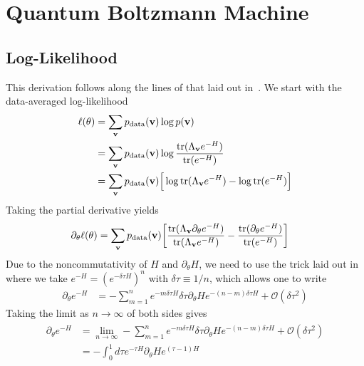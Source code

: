\section{Quantum Boltzmann Machine}
\subsection{Log-Likelihood}\label{app:qbm_log_likelihood_derivation}
This derivation follows along the lines of that laid out in~\cite{amin_2018}.
We start with the data-averaged log-likelihood
\begin{align}
\begin{split}
    \ell(\theta)
        &= \sum_{\mathbf{v}} p_{\text{data}}(\mathbf{v}) \log p(\mathbf{v}) \\
        &= \sum_{\mathbf{v}} p_{\text{data}}(\mathbf{v}) \log \frac{\text{tr}(\Lambda_{\mathbf{v}} e^{-H})}{\text{tr}(e^{-H})} \\
        &= \sum_{\mathbf{v}} p_{\text{data}}(\mathbf{v}) \Big[ \log\text{tr}(\Lambda_{\mathbf{v}} e^{-H}) - \log\text{tr}(e^{-H}) \Big]
\end{split}
\end{align}
Taking the partial derivative yields
\begin{align}
    \label{eq:qbm_log_likelihood_derivative}
    \partial_\theta \ell(\theta)
        &= \sum_{\mathbf{v}} p_{\text{data}}(\mathbf{v}) \bigg[ \frac{\text{tr}(\Lambda_{\mathbf{v}} \partial_\theta e^{-H})}{\text{tr}(\Lambda_{\mathbf{v}} e^{-H})} - \frac{\text{tr}(\partial_\theta e^{-H})}{\text{tr}(e^{-H})} \bigg]
\end{align}
Due to the noncommutativity of \( H \) and \( \partial_\theta H \), we need to use the trick laid out in~\cite{amin_2018} where we take \( e^{-H} = (e^{-\delta\tau H})^n \) with \( \delta\tau \equiv 1 / n \), which allows one to write
\begin{align}
    \partial_\theta e^{-H}
        &= -\sum_{m=1}^{n} e^{-m\delta\tau H} \delta\tau \partial_\theta He^{-(n-m)\delta\tau H} + \mathcal{O}(\delta\tau^2)
\end{align}
Taking the limit as \( n \rightarrow \infty \) of both sides gives
\begin{align}
\begin{split}
    \partial_\theta e^{-H}
        &= \lim_{n\rightarrow\infty} -\sum_{m=1}^{n} e^{-m\delta\tau H} \delta\tau \partial_\theta He^{-(n-m)\delta\tau H} + \mathcal{O}(\delta\tau^2) \\
        &= -\int_{0}^{1} d\tau e^{-\tau H} \partial_\theta H e^{(\tau-1)H}
\end{split}
\end{align}
